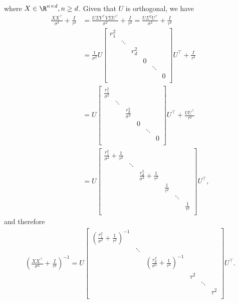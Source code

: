 where $X \in \R^{n \times d}, n \geq d$.  Given that $U$ is orthogonal, we have
\begin{align*}
	\frac{XX^\top}{\sigma^2} + \frac{I}{\tau^2} & = \frac{U\Sigma V^\top V \Sigma U^\top}{\sigma^2} + \frac{I}{\tau^2}  = \frac{U \Sigma^2 U^\top}{\sigma^2} + \frac{I}{\tau^2}\\
	& = \frac{1}{\sigma^2} U 
	\begin{bmatrix}
		r_1^2 & & & & & \\
		& \ddots & & & & \\
		& & r_d^2 & & & \\
		& & & 0 & & \\
		& & & & \ddots & \\
		& & & & & 0 \\
	\end{bmatrix}
	U^\top + \frac{I}{\tau^2} \\
	&=  U 
	\begin{bmatrix}
		\frac{r_1^2}{\sigma^2} & & & & &  \\
		& \ddots & & & & \\
		& & \frac{r_d^2}{\sigma^2} & & &  \\
		& & & 0 & & \\
		& & & & \ddots & \\
		& & & & & 0 \\
	\end{bmatrix}
	U^\top + \frac{UU^\top}{\tau^2}\\
	&=  U 
	\begin{bmatrix}
		\frac{r_1^2}{\sigma^2} + \frac{1}{\tau^2} & & & & &  \\
		& \ddots & & & & \\
		& & \frac{r_d^2}{\sigma^2} + \frac{1}{\tau^2} & & &  \\
		& & & \frac{1}{\tau^2} & & \\
		& & & & \ddots & \\
		& & & & & \frac{1}{\tau^2} \\
	\end{bmatrix}
	U^\top,
\end{align*}
and therefore
\begin{align*}
	(\frac{XX^\top}{\sigma^2} + \frac{I}{\tau^2})^{-1}  = U 
		\begin{bmatrix}
			(\frac{r_1^2}{\sigma^2} + \frac{1}{\tau^2})^{-1} & & & & &  \\
			&\ddots & & & & \\
			& & (\frac{r_d^2}{\sigma^2} + \frac{1}{\tau^2})^{-1} & & &  \\
			& & & \tau^2 & & \\
			& & & & \ddots & \\
			& & & & & \tau^2 \\
		\end{bmatrix}
		U^\top. \\
\end{align*}
